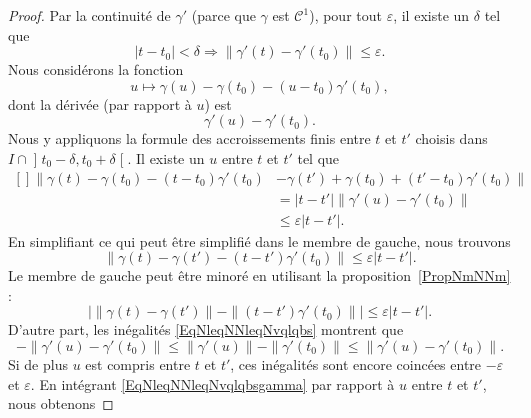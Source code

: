 \begin{proof}
	Par la continuité de \( \gamma'\) (parce que \( \gamma\) est \( \mathcal{C}^1\)), pour tout \( \varepsilon\), il existe un \( \delta\) tel que
	\begin{equation}
		| t-t_0 |<\delta\Rightarrow\big\| \gamma'(t)-\gamma'(t_0) \big\|\leq \varepsilon.
	\end{equation}
	Nous considérons la fonction
	\begin{equation}
		u\mapsto \gamma(u)-\gamma(t_0)-(u-t_0)\gamma'(t_0),
	\end{equation}
	dont la dérivée (par rapport à \( u\)) est
	\begin{equation}
		\gamma'(u)-\gamma'(t_0).
	\end{equation}
	Nous y appliquons la formule des accroissements finis entre \( t\) et \( t'\) choisis dans \( I\cap\mathopen] t_0-\delta , t_0+\delta \mathclose[\). Il existe un \( u\) entre \( t\) et \( t'\) tel que
	\begin{equation}
		\begin{aligned}[]
			\big\| \gamma(t)-\gamma(t_0)-(t-t_0)\gamma'(t_0) & -\gamma(t')+\gamma(t_0)+(t'-t_0)\gamma'(t_0) \big\| \\
			                                                 & =| t-t' | \|\gamma'(u)-\gamma'(t_0) \|              \\
			                                                 & \leq\varepsilon| t-t' |.
		\end{aligned}
	\end{equation}
	En simplifiant ce qui peut être simplifié dans le membre de gauche, nous trouvons
	\begin{equation}
		\big\| \gamma(t)-\gamma(t')-(t-t')\gamma'(t_0) \big\|\leq\varepsilon| t-t' |.
	\end{equation}
	Le membre de gauche peut être minoré en utilisant la proposition~\ref{PropNmNNm} :
	\begin{equation}        \label{Eq0308ffttttftt}
		\Big| \| \gamma(t)-\gamma(t')\| -\|(t-t')\gamma'(t_0) \| \Big|\leq\varepsilon| t-t' |.
	\end{equation}
	D'autre part, les inégalités \eqref{EqNleqNNleqNvqlqbs} montrent que
	\begin{equation} \label{EqNleqNNleqNvqlqbsgamma}
		-\| \gamma'(u)-\gamma'(t_0) \|\leq \| \gamma'(u) \|-\| \gamma'(t_0) \|\leq\| \gamma'(u)-\gamma'(t_0) \|.
	\end{equation}
	Si de plus \( u\) est compris entre \( t\) et \( t'\), ces inégalités sont encore coincées entre \( -\varepsilon\) et \( \varepsilon\). En intégrant \eqref{EqNleqNNleqNvqlqbsgamma} par rapport à \( u\) entre \( t\) et \( t'\), nous obtenons

\end{proof}
